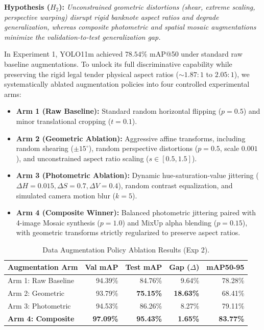 \documentclass[conference]{IEEEtran}
\begin{document}
\noindent\textbf{Hypothesis ($H_2$):} \textit{Unconstrained geometric distortions (shear, extreme scaling, perspective warping) disrupt rigid banknote aspect ratios and degrade generalization, whereas composite photometric and spatial mosaic augmentations minimize the validation-to-test generalization gap.}

In Experiment 1, YOLO11m achieved $78.54\%$ mAP@50 under standard raw baseline augmentations. To unlock its full discriminative capability while preserving the rigid legal tender physical aspect ratios ($\sim 1.87:1$ to $2.05:1$), we systematically ablated augmentation policies into four controlled experimental arms:
\begin{itemize}
    \item \textbf{Arm 1 (Raw Baseline):} Standard random horizontal flipping ($p = 0.5$) and minor translational cropping ($t = 0.1$).
    \item \textbf{Arm 2 (Geometric Ablation):} Aggressive affine transforms, including random shearing ($\pm 15^\circ$), random perspective distortions ($p = 0.5$, scale $0.001$), and unconstrained aspect ratio scaling ($s \in [0.5, 1.5]$).
    \item \textbf{Arm 3 (Photometric Ablation):} Dynamic hue-saturation-value jittering ($\Delta H = 0.015, \Delta S = 0.7, \Delta V = 0.4$), random contrast equalization, and simulated camera motion blur ($k = 5$).
    \item \textbf{Arm 4 (Composite Winner):} Balanced photometric jittering paired with 4-image Mosaic synthesis ($p = 1.0$) and MixUp alpha blending \cite{zhang2018mixup,yun2019cutmix} ($p = 0.15$), with geometric transforms strictly regularized to preserve aspect ratios.
\end{itemize}

\begin{table}[h]
\centering
\caption{Data Augmentation Policy Ablation Results (Exp 2).}
\label{tab:exp2_augmentation}
\scriptsize
\setlength{\tabcolsep}{3.0pt}
\begin{tabular}{lrrrr}
\toprule
\textbf{Augmentation Arm} & \textbf{Val mAP} & \textbf{Test mAP} & \textbf{Gap ($\Delta$)} & \textbf{mAP50-95} \\
\midrule
Arm 1: Raw Baseline & 94.39\% & 84.76\% & 9.64\% & 78.28\% \\
Arm 2: Geometric & 93.79\% & \textbf{75.15\%} & \textbf{18.63\%} & 68.41\% \\
Arm 3: Photometric & 94.53\% & 86.26\% & 8.27\% & 79.11\% \\
\textbf{Arm 4: Composite} & \textbf{97.09\%} & \textbf{95.43\%} & \textbf{1.65\%} & \textbf{83.77\%} \\
\bottomrule
\end{tabular}
\end{table}
\end{document}
